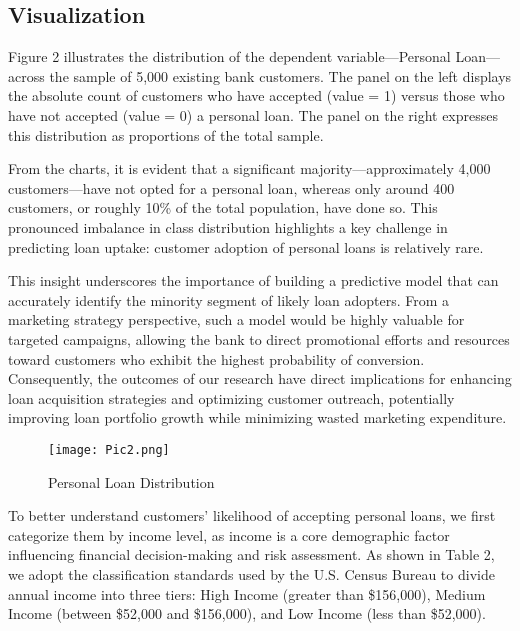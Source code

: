 \documentclass[12pt]{article}
\begin{document}
\subsection{Visualization}

Figure 2 illustrates the distribution of the dependent variable—Personal Loan—across the sample of 5,000 existing bank customers. The panel on the left displays the absolute count of customers who have accepted (value = 1) versus those who have not accepted (value = 0) a personal loan. The panel on the right expresses this distribution as proportions of the total sample.

From the charts, it is evident that a significant majority—approximately 4,000 customers—have not opted for a personal loan, whereas only around 400 customers, or roughly 10\% of the total population, have done so. This pronounced imbalance in class distribution highlights a key challenge in predicting loan uptake: customer adoption of personal loans is relatively rare.

This insight underscores the importance of building a predictive model that can accurately identify the minority segment of likely loan adopters. From a marketing strategy perspective, such a model would be highly valuable for targeted campaigns, allowing the bank to direct promotional efforts and resources toward customers who exhibit the highest probability of conversion. Consequently, the outcomes of our research have direct implications for enhancing loan acquisition strategies and optimizing customer outreach, potentially improving loan portfolio growth while minimizing wasted marketing expenditure.
\begin{figure}
    \centering
    \texttt{[image: Pic2.png]}
    \caption{Personal Loan Distribution}
    \label{fig:enter-label}
\end{figure}

To better understand customers’ likelihood of accepting personal loans, we first categorize them by income level, as income is a core demographic factor influencing financial decision-making and risk assessment. As shown in Table 2, we adopt the classification standards used by the U.S. Census Bureau to divide annual income into three tiers: High Income (greater than \$156,000), Medium Income (between \$52,000 and \$156,000), and Low Income (less than \$52,000).
\end{document}
